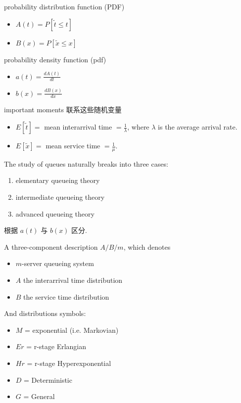 probability distribution function (PDF)
\begin{itemize}
    \item $A(t)=P[\tilde{t}\le t]$
    \item $B(x)=P[\tilde{x}\le x]$
\end{itemize}

probability density function (pdf)
\begin{itemize}
    \item $a(t)=\frac{d A(t)}{dt}$
    \item $b(x)=\frac{d B(x)}{dx}$
\end{itemize}

important moments 联系这些随机变量
\begin{itemize}
    \item $E[\tilde{t}]=$ mean interarrival time $=\frac{1}{\lambda}$, where $\lambda$ is the average arrival rate. 
    \item $E[\tilde{x}]=$ mean service time $=\frac{1}{\mu}$. 
\end{itemize}

The study of queues naturally breaks into three cases:
\begin{enumerate}
    \item elementary queueing theory
    \item intermediate queueing theory
    \item advanced queueing theory
\end{enumerate}
根据 $a(t)$ 与 $b(x)$ 区分. 

A three-component description $A/B/m$, which denotes 
\begin{itemize}
    \item $m$-server queueing system
    \item $A$ the interarrival time distribution
    \item $B$ the service time distribution
\end{itemize}

And distributions symbols:
\begin{itemize}
    \item $M$ = exponential (i.e. Markovian)
    \item $Er$ = r-stage Erlangian
    \item $Hr$ = r-stage Hyperexponential
    \item $D$ = Deterministic
    \item $G$ = General
\end{itemize}

